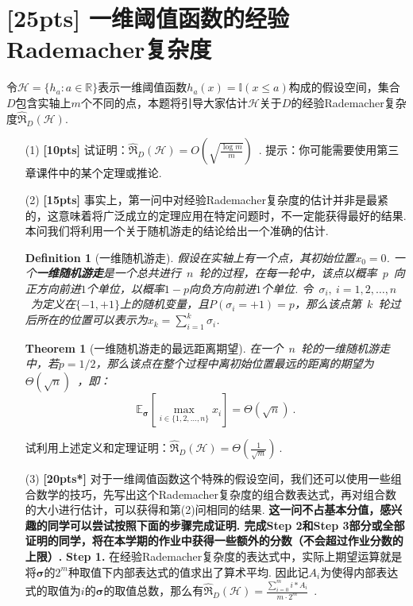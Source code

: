 \documentclass[a4paper,UTF8]{article}
\numberwithin{equation}{section}
\newtheorem{definition}{Definition}
\newtheorem{theorem}{Theorem}
\begin{document}
\newpage 

\section{[25pts] 一维阈值函数的经验Rademacher复杂度}

\noindent 令$ \mathcal{H}=\{h_a:a\in\mathbb{R}\} $表示一维阈值函数$ h_a(x)=\mathbb{I}(x\leq a) $构成的假设空间，集合$ D $包含实轴上$ m $个不同的点，本题将引导大家估计$ \mathcal{H} $关于$ D $的经验Rademacher复杂度$ \hat{\mathfrak{R}}_{D}(\mathcal{H})$. 
\begin{enumerate}
    \item[(1)] \textbf{[10pts]} 试证明：$\hat{\mathfrak{R}}_{D}(\mathcal{H})=O\left(\sqrt{\frac{\log m}{m}}\right)$~. 提示：你可能需要使用第三章课件中的某个定理或推论.
    \item[(2)] \textbf{[15pts]} 事实上，第一问中对经验Rademacher复杂度的估计并非是最紧的，这意味着将广泛成立的定理应用在特定问题时，不一定能获得最好的结果. 本问我们将利用一个关于随机游走的结论给出一个准确的估计. 
    \begin{definition}[一维随机游走]
        假设在实轴上有一个点，其初始位置$x_0=0$. 一个\textbf{一维随机游走}是一个总共进行~$n$~轮的过程，在每一轮中，该点以概率~$p$~向正方向前进$1$个单位，以概率$1-p$向负方向前进$1$个单位. 令~$\sigma_i,~i=1,2,\dots,n$~为定义在$\{-1, +1\}$上的随机变量，且$P(\sigma_i=+1)=p$，那么该点第~$k$~轮过后所在的位置可以表示为$x_k=\sum_{i=1}^k \sigma_i$. 
    \end{definition}
    \begin{theorem}[一维随机游走的最远距离期望]
        在一个~$n$~轮的一维随机游走中，若$p=1/2$，那么该点在整个过程中离初始位置最远的距离的期望为~$\Theta\left(\sqrt{n}\right)$~，即：
        $$ \mathbb{E}_{\boldsymbol{\sigma}}\left[ \max_{i\in\{1,2,\dots,n\}}x_i \right]= \Theta\left(\sqrt{n}\right)~.$$
    \end{theorem}
    试利用上述定义和定理证明：$\hat{\mathfrak{R}}_{D}(\mathcal{H})=\Theta\left(\frac{1}{\sqrt{m}}\right)~.$
    \item[(3)] \textbf{[20pts*]} 对于一维阈值函数这个特殊的假设空间，我们还可以使用一些组合数学的技巧，先写出这个Rademacher复杂度的组合数表达式，再对组合数的大小进行估计，可以获得和第(2)问相同的结果. \textbf{这一问不占基本分值，感兴趣的同学可以尝试按照下面的步骤完成证明. 完成Step 2和Step 3部分或全部证明的同学，将在本学期的作业中获得一些额外的分数（不会超过作业分数的上限）. }
    \newline\text{  } 
    \newline\noindent \textbf{Step 1.} 在经验Rademacher复杂度的表达式中，实际上期望运算就是将$\boldsymbol{\sigma}$的$2^m$种取值下内部表达式的值求出了算术平均. 因此记$A_i$为使得内部表达式的取值为$i$的$\boldsymbol{\sigma}$的取值总数，那么有$\hat{\mathfrak{R}}_{D}(\mathcal{H})=\frac{\sum_{i=0}^m i*A_i}{m\cdot 2^m}$~.

\end{enumerate}
\end{document}
